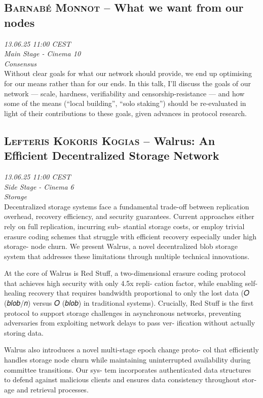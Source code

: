 \clearpage
\subsection {\textsc{Barnabé Monnot}  -- What we want from our nodes} \noindent \textit {13.06.25 11:00 CEST\\ Main Stage - Cinema 10\\ Consensus}\\[1em] Without clear goals for what our network should provide, we end up optimising for our means rather than for our ends. In this talk, I'll discuss the goals of our network — scale, hardness, verifiability and censorship-resistance — and how some of the means (``local building'', ``solo staking'') should be re-evaluated in light of their contributions to these goals, given advances in protocol research.

\clearpage
\subsection {\textsc{Lefteris Kokoris Kogias}  -- Walrus: An Efficient Decentralized Storage Network} \noindent \textit {13.06.25 11:00 CEST\\ Side Stage - Cinema 6\\ Storage}\\[1em] Decentralized storage systems face a fundamental trade-off between
replication overhead, recovery efficiency, and security guarantees.
Current approaches either rely on full replication, incurring sub-
stantial storage costs, or employ trivial erasure coding schemes
that struggle with efficient recovery especially under high storage-
node churn. We present Walrus, a novel decentralized blob storage
system that addresses these limitations through multiple technical
innovations.

At the core of Walrus is Red Stuff, a two-dimensional erasure
coding protocol that achieves high security with only 4.5x repli-
cation factor, while enabling self-healing recovery that requires
bandwidth proportional to only the lost data (𝑂 (\textbar{}𝑏𝑙𝑜𝑏\textbar{}/𝑛) versus
𝑂 (\textbar{}𝑏𝑙𝑜𝑏\textbar{}) in traditional systems). Crucially, Red Stuff is the first
protocol to support storage challenges in asynchronous networks,
preventing adversaries from exploiting network delays to pass ver-
ification without actually storing data.

Walrus also introduces a novel multi-stage epoch change proto-
col that efficiently handles storage node churn while maintaining
uninterrupted availability during committee transitions. Our sys-
tem incorporates authenticated data structures to defend against
malicious clients and ensures data consistency throughout stor-
age and retrieval processes.

